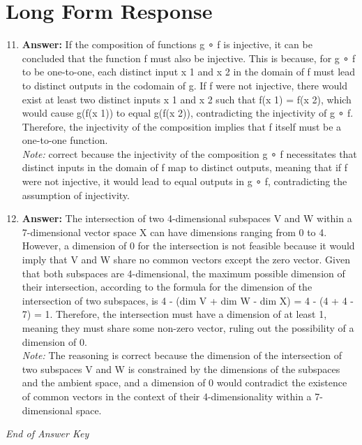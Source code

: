 \documentclass[12pt]{article}
\begin{document}
\section*{Long Form Response}
\begin{enumerate}[label=\arabic*.]
\setcounter{enumi}{10}
\item \textbf{Answer:} If the composition of functions g ∘ f is injective, it can be concluded that the function f must also be injective. This is because, for g ∘ f to be one-to-one, each distinct input x 1 and x 2 in the domain of f must lead to distinct outputs in the codomain of g. If f were not injective, there would exist at least two distinct inputs x 1 and x 2 such that f(x 1) = f(x 2), which would cause g(f(x 1)) to equal g(f(x 2)), contradicting the injectivity of g ∘ f. Therefore, the injectivity of the composition implies that f itself must be a one-to-one function.
\\ \textit{Note:} correct because the injectivity of the composition g ∘ f necessitates that distinct inputs in the domain of f map to distinct outputs, meaning that if f were not injective, it would lead to equal outputs in g ∘ f, contradicting the assumption of injectivity.
\item \textbf{Answer:} The intersection of two 4-dimensional subspaces V and W within a 7-dimensional vector space X can have dimensions ranging from 0 to 4. However, a dimension of 0 for the intersection is not feasible because it would imply that V and W share no common vectors except the zero vector. Given that both subspaces are 4-dimensional, the maximum possible dimension of their intersection, according to the formula for the dimension of the intersection of two subspaces, is 4 - (dim V + dim W - dim X) = 4 - (4 + 4 - 7) = 1. Therefore, the intersection must have a dimension of at least 1, meaning they must share some non-zero vector, ruling out the possibility of a dimension of 0.
\\ \textit{Note:} The reasoning is correct because the dimension of the intersection of two subspaces V and W is constrained by the dimensions of the subspaces and the ambient space, and a dimension of 0 would contradict the existence of common vectors in the context of their 4-dimensionality within a 7-dimensional space.
\end{enumerate}

\vfill
\noindent\textit{End of Answer Key}
\end{document}
